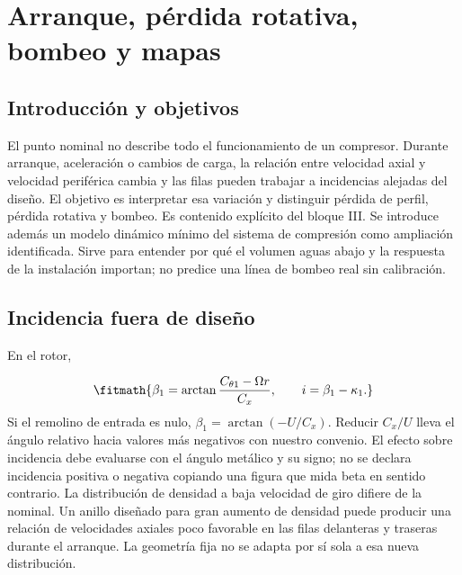 \documentclass[10pt,openany]{book}
\begin{document}
\studiumchaptercheck

\chapter{Arranque, pérdida rotativa, bombeo y mapas}
\label{chap:c10}


\section{Introducción y objetivos}

El punto nominal no describe todo el funcionamiento de un compresor. Durante arranque, aceleración o cambios de carga, la relación entre velocidad axial y velocidad periférica cambia y las filas pueden trabajar a incidencias alejadas del diseño. El objetivo es interpretar esa variación y distinguir pérdida de perfil, pérdida rotativa y bombeo. Es contenido explícito del bloque III.
Se introduce además un modelo dinámico mínimo del sistema de compresión como ampliación identificada. Sirve para entender por qué el volumen aguas abajo y la respuesta de la instalación importan; no predice una línea de bombeo real sin calibración.

\section{Incidencia fuera de diseño}


En el rotor,



\[
\fitmath{\beta_1=\arctan\frac{C_{\theta1}-\Omega r}{C_x},\qquad i=\beta_1-\kappa_1.}
\]
Si el remolino de entrada es nulo, \(\beta_1=\arctan(-U/C_x)\). Reducir \(C_x/U\) lleva el ángulo relativo hacia valores más negativos con nuestro convenio. El efecto sobre incidencia debe evaluarse con el ángulo metálico y su signo; no se declara incidencia positiva o negativa copiando una figura que mida beta en sentido contrario.
La distribución de densidad a baja velocidad de giro difiere de la nominal. Un anillo diseñado para gran aumento de densidad puede producir una relación de velocidades axiales poco favorable en las filas delanteras y traseras durante el arranque. La geometría fija no se adapta por sí sola a esa nueva distribución.
\end{document}
